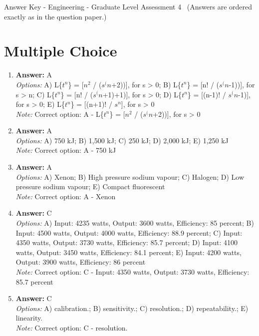 \documentclass[12pt]{article}
\begin{document}
\begin{center}
Answer Key - Engineering - Graduate Level Assessment 4 \
\small (Answers are ordered exactly as in the question paper.)
\end{center}

\section*{Multiple Choice}
\begin{enumerate}[label=\arabic*.]
\item \textbf{Answer:} A
\\ \textit{Options:} A) L\{$t^n$\} = [$n^2$ / ($s^(n$+2))], for s \textgreater{} 0; B) L\{$t^n$\} = [n! / ($s^(n$-1))], for s \textgreater{} n; C) L\{$t^n$\} = [n! / ($s^(n$+1)+1)], for s \textgreater{} 0; D) L\{$t^n$\} = [(n-1)! / $s^(n$-1)], for s \textgreater{} 0; E) L\{$t^n$\} = [(n+1)! / $s^n$], for s \textgreater{} 0
\\ \textit{Note:} Correct option: A - L\{$t^n$\} = [$n^2$ / ($s^(n$+2))], for s \textgreater{} 0
\item \textbf{Answer:} A
\\ \textit{Options:} A) 750 kJ; B) 1,500 kJ; C) 250 kJ; D) 2,000 kJ; E) 1,250 kJ
\\ \textit{Note:} Correct option: A - 750 kJ
\item \textbf{Answer:} A
\\ \textit{Options:} A) Xenon; B) High pressure sodium vapour; C) Halogen; D) Low pressure sodium vapour; E) Compact fluorescent
\\ \textit{Note:} Correct option: A - Xenon
\item \textbf{Answer:} C
\\ \textit{Options:} A) Input: 4235 watts, Output: 3600 watts, Efficiency: 85 percent; B) Input: 4500 watts, Output: 4000 watts, Efficiency: 88.9 percent; C) Input: 4350 watts, Output: 3730 watts, Efficiency: 85.7 percent; D) Input: 4100 watts, Output: 3450 watts, Efficiency: 84.1 percent; E) Input: 4200 watts, Output: 3900 watts, Efficiency: 86 percent
\\ \textit{Note:} Correct option: C - Input: 4350 watts, Output: 3730 watts, Efficiency: 85.7 percent
\item \textbf{Answer:} C
\\ \textit{Options:} A) calibration.; B) sensitivity.; C) resolution.; D) repeatability.; E) linearity.
\\ \textit{Note:} Correct option: C - resolution.
\end{enumerate}
\end{document}

